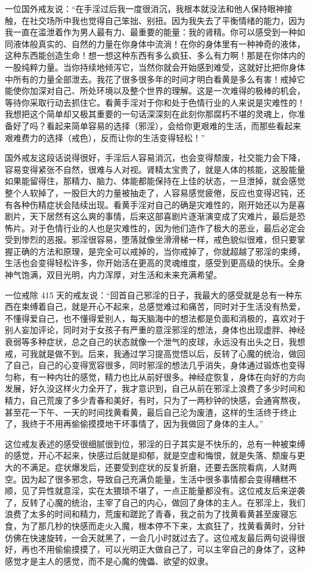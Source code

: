 一位国外戒友说：“在手淫过后我一度很消沉，我根本就没法和他人保持眼神接触，在社交场所中我也觉得自己笨拙、别扭。因为我失去了平衡情绪的能力，因为我一直在滥泄着作为男人最有力、最重要的能量：我的肾精。你可以感受到一种如同液体般真实的、自然的力量在你身体中流淌！在你的身体里有一种神奇的液体，这种东西能创造生命！想一想这种东西有多么疯狂、多么有力啊！那是在你体内的一股纯粹力量。当你持续地倾泻它，当然你就会开始感到难受，这就好比把你身体中所有的力量全部泄去。我花了很多很多年的时间才明白看黄是多么有害！戒掉它能使你加深对自己、所处环境以及整个世界的理解。这是一次难得的极棒的机会，等待你采取行动去抓住它。看黄手淫对于你和处于色情行业的人来说是灾难性的！我想把这个简单却又极其重要的一句话深深刻在此刻你那腐朽不堪的灵魂上，你准备好了吗？看起来简单容易的选择（邪淫），会给你更艰难的生活，而那些看起来艰难费力的选择（戒色），反而让你的生活变得轻松！”

国外戒友这段话说得很好，手淫后人容易消沉，也会变得颓废，社交能力会下降，容易变得紧张不自然，很难与人对视。肾精太宝贵了，就是人体的核能，这股能量如果能留得住，那精力、脑力、体能都能保持在上佳的状态，一旦泄掉，就会感觉整个人软掉了，一股巨大的力量被抽走了，人容易感觉疲倦，反应也变得迟钝，还有各种伤精症状会陆续出现。看黄手淫对自己的确是灾难性的，刚开始还以为是喜剧片，天下居然有这么爽的事情，后来这部喜剧片逐渐演变成了灾难片，最后是恐怖片。对于色情行业的人也是灾难性的，因为他们造作了极大的恶业，最后必定会受到惨烈的恶报。邪淫很容易，堕落就像坐滑滑梯一样，戒色貌似很难，但只要掌握正确的方法和原理，是完全可以戒掉的，当你戒掉了，你就超越了邪淫的束缚，生活也会变得轻松许多，你开始活在更高的灵魂维度，感受到更高级的快乐。全身神气饱满，双目光明，内力浑厚，对生活和未来充满希望。

一位戒除 415 天的戒友说：“回首自己邪淫的日子，我最大的感受就是总有一种东西在束缚着自己，就是开心不起来，总感觉难过和痛苦，同时对于生活没有热爱，不懂得爱自己，也不懂得爱别人，每天脑海中的想法都是负面和消极的，喜欢对于别人妄加评论，同时对于女孩子有严重的意淫邪淫的想法，身体也出现虚胖、神经衰弱等多种症状，总之自己的状态就像一个泄气的皮球，永远没有出头之日，我想戒，可我就是做不到。后来，我通过学习提高觉悟以后，反转了心魔的统治，做回了自己，自己的心变得宽容很多，同时邪淫的想法几乎消失，身体通过锻炼也变得匀称，有一种内壮的感觉，精力也比从前好很多。神经症恢复，身体在向好的方向发展，好久没这样火力全开了，我才意识到，自己从前在邪淫上浪费了多少时间和精力，自己荒废了多少青春和美好，有时，只为了一两秒钟的快感，会通宵熬夜，甚至花一下午、一天的时间找黄看黄，最后自己沦为废渣，这样的生活终于终止了，我终于不用再偷偷摸摸地干坏事情了，因为我做回了身体的主人。”

这位戒友表述的感受很细腻很到位，邪淫的日子其实是不快乐的，总有一种被束缚的感觉，开心不起来，快感过后就是抑郁，就是空虚和悔恨，就是失落、颓废与更大的不满足。症状爆发后，还要受到症状的反复折磨，还要去医院看病，人财两空。因为起了很多邪念，导致自己充满负能量，生活中很多事情都会变得糟糕不顺，见了异性就意淫，实在太猥琐不堪了，一点正能量都没有。这位戒友后来逆袭了，反转了心魔的统治，主宰了自己的内心，做回了身体的主人。在邪淫上，我们浪费了太多的时间和精力，荒废和蹉跎了青春，我之前为了找黄看黄甚至废寝忘食，为了那几秒的快感而走火入魔，根本停不下来，太疯狂了，找黄看黄时，分针仿佛在快速旋转，一会天就黑了，一会几小时就过去了。这位戒友最后两句说得很好，再也不用偷偷摸摸了，可以光明正大做自己了，可以主宰自己的身体了，这种感觉才是主人的感觉，而不是心魔的傀儡、欲望的奴隶。

